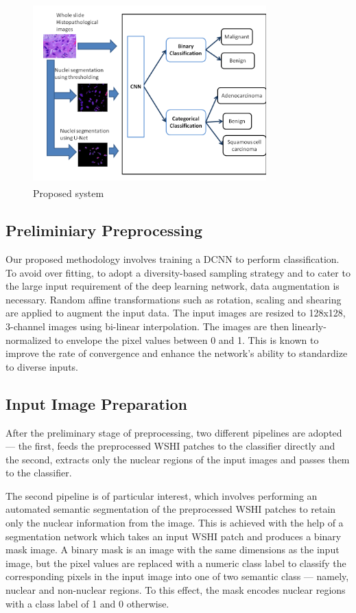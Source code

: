 \documentclass{comjnl}
\begin{document}
\begin{figure}[htbp]
\centerline{\includegraphics[width=9cm, height=7cm]{./figures/proposed_system.png}}
\caption{Proposed system}
\label{proposed sys}
\end{figure}

\subsection{Preliminiary Preprocessing}
\label{sect_datapreprocess}
Our proposed methodology involves training a DCNN to perform classification. To avoid over fitting, to adopt a diversity-based sampling strategy and to cater to the large input requirement of the deep learning network, data augmentation is necessary. Random affine transformations such as rotation, scaling and shearing are applied to augment the input data. The input images are resized to 128x128, 3-channel images using bi-linear interpolation. The images are then linearly-normalized to envelope the pixel values between 0 and 1. This is known to improve the rate of convergence and enhance the network's ability to standardize to diverse inputs.

\subsection{Input Image Preparation}

After the preliminary stage of preprocessing, two different pipelines are adopted --- the first, feeds the preprocessed WSHI patches to the classifier directly and the second, extracts only the nuclear regions of the input images and passes them to the classifier.

The second pipeline is of particular interest, which involves performing an automated semantic segmentation of the preprocessed WSHI patches to retain only the nuclear information from the image. This is achieved with the help of a segmentation network which takes an input WSHI patch and produces a binary mask image. A binary mask is an image with the same dimensions as the input image, but the pixel values are replaced with a numeric class label to classify the corresponding pixels in the input image into one of two semantic class --- namely, nuclear and non-nuclear regions. To this effect, the mask encodes nuclear regions with a class label of 1 and 0 otherwise. 
\end{document}
